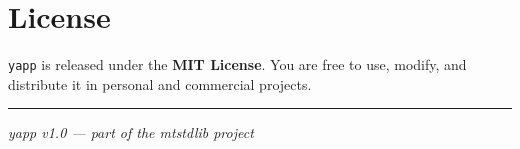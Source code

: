 \documentclass[11pt, a4paper]{article}
\begin{document}
\section{License}

\texttt{yapp} is released under the \textbf{MIT License}.
You are free to use, modify, and distribute it in personal and commercial projects.

\vspace{1em}
\hrule
\vspace{0.5em}
{\small\textit{yapp v1.0 — part of the mtstdlib project}}
\end{document}
